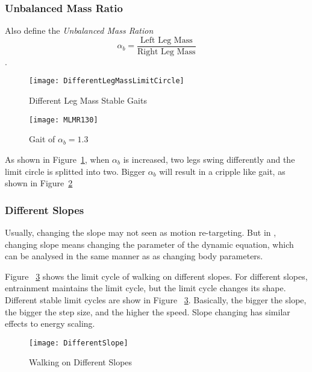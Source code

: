 \subsubsection*{Unbalanced Mass Ratio}
Also define the \emph{Unbalanced Mass Ration} 
\[
\alpha_b=\frac{\text{Left Leg Mass}}{\text{Right Leg Mass}}
\].


\begin{figure}[!htbp]
  \begin{center}
      \texttt{[image: DifferentLegMassLimitCircle]}
    \caption{Different Leg Mass Stable Gaits}
    \label{fig:differentlr}
\end{center}
\end{figure}




\begin{figure}[!htbp]
  \begin{center}
      \texttt{[image: MLMR130]}
    \caption{Gait of $\alpha_b=1.3$}
    \label{fig:lm2}
\end{center}
\end{figure}
As shown in Figure~\ref{fig:differentlr}, when $\alpha_b$ is increased, two legs swing differently and the limit circle is splitted into two.
Bigger $\alpha_b$  will result in a cripple like gait, as shown in Figure~\ref{fig:lm2}



\subsubsection*{Different Slopes}
Usually, changing the slope may not seen as motion re-targeting.
But in \moit, changing slope means changing the parameter of the dynamic equation, which can be analysed in the same manner as as changing body parameters.


Figure ~\ref{fig:diffslopes} shows the limit cycle of walking on different slopes.
For different slopes, entrainment maintains the limit cycle, but the limit cycle changes its shape.
Different stable limit cycles are show in Figure ~\ref{fig:diffslopes}.
Basically, the bigger the slope, the bigger the step size, and the higher the speed.
Slope changing has similar effects to energy scaling.



\begin{figure}[!htbp]
  \begin{center}
      \texttt{[image: DifferentSlope]}
    \caption{Walking on Different Slopes}
    \label{fig:diffslopes}
\end{center}
\end{figure}

